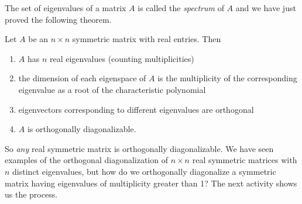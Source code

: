 


The set of eigenvalues of a matrix $A$ is called the \emph{spectrum} of $A$ and we have just proved the following theorem.



\begin{theorem} Let $A$ be an $n \times n$ symmetric matrix with real entries. Then
\begin{enumerate}
\item $A$ has $n$ real eigenvalues (counting multiplicities)
\item the dimension of each eigenspace of $A$ is the multiplicity of the corresponding eigenvalue as a root of the characteristic polynomial
\item eigenvectors corresponding to different eigenvalues are orthogonal
\item $A$ is orthogonally diagonalizable.
\end{enumerate}
\end{theorem}



So \emph{any} real symmetric matrix is orthogonally diagonalizable. We have seen examples of the orthogonal diagonalization of $n \times n$  real symmetric matrices with $n$ distinct eigenvalues, but how do we orthogonally diagonalize a symmetric matrix having eigenvalues of multiplicity greater than 1? The next activity shows us the process.



	
	
	
